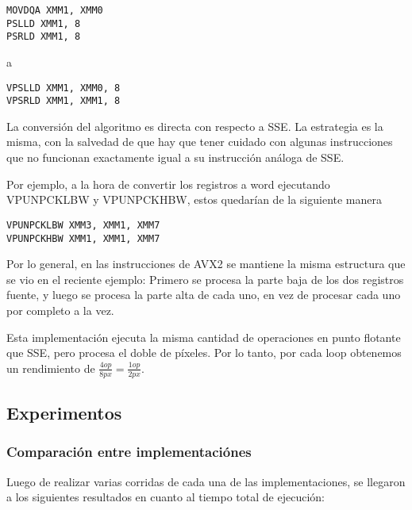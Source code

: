\begin{lstlisting}
MOVDQA XMM1, XMM0
PSLLD XMM1, 8
PSRLD XMM1, 8
\end{lstlisting}

a

\begin{lstlisting}
VPSLLD XMM1, XMM0, 8
VPSRLD XMM1, XMM1, 8
\end{lstlisting}


La conversión del algoritmo es directa con respecto a SSE. La estrategia es la misma, con la salvedad de que hay que tener cuidado con algunas instrucciones que no funcionan exactamente igual a su instrucción análoga de SSE.

Por ejemplo, a la hora de convertir los registros a word ejecutando VPUNPCKLBW y VPUNPCKHBW, estos quedarían de la siguiente manera

\begin{lstlisting}
VPUNPCKLBW XMM3, XMM1, XMM7
VPUNPCKHBW XMM1, XMM1, XMM7
\end{lstlisting}

 

 

Por lo general, en las instrucciones de AVX2 se mantiene la misma estructura que se vio en el reciente ejemplo: Primero se procesa la parte baja de los dos registros fuente, y luego se procesa la parte alta de cada uno, en vez de procesar cada uno por completo a la vez.

Esta implementación ejecuta la misma cantidad de operaciones en punto flotante que SSE, pero procesa el doble de píxeles. Por lo tanto, por cada loop obtenemos un rendimiento de $\frac{4op}{8px} = \frac{1op}{2px}$.


\subsection{Experimentos}

\subsubsection{Comparación entre implementaciónes}

 Luego de realizar varias corridas de cada una de las implementaciones, se llegaron a los siguientes resultados en cuanto al tiempo total de ejecución:

